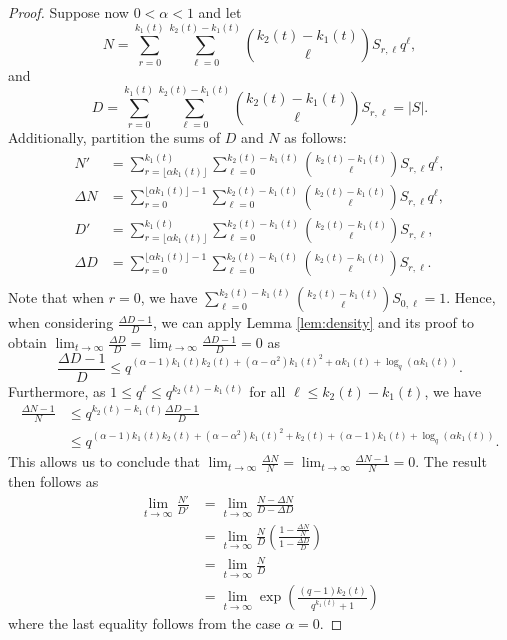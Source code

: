 \documentclass[10pt,a4paper]{amsart}
\begin{document}
\begin{proof}
Suppose now $0<\alpha <1$ and let $$N = \sum_{r=0}^{k_1(t)} \sum_{\ell=0}^{k_2(t)-k_1(t)} \binom{k_2(t)-k_1(t)}{\ell}S_{r,\ell}q^{\ell},$$ and $$D =\sum_{r=0}^{k_1(t)} \sum_{\ell=0}^{k_2(t)-k_1(t)} \binom{k_2(t)-k_1(t)}{\ell}S_{r,\ell} = |S|.$$ Additionally, partition the sums of $D$ and $N$ as follows:
\begin{align*}
    N' &= \sum_{r=\lfloor\alpha k_1(t)\rfloor}^{k_1(t)} \sum_{\ell=0}^{k_2(t)-k_1(t)} \binom{k_2(t)-k_1(t)}{\ell}S_{r,\ell}q^{\ell},\\
    \Delta N &= \sum_{r=0}^{\lfloor \alpha k_1(t) \rfloor -1} \sum_{\ell=0}^{k_2(t)-k_1(t)} \binom{k_2(t)-k_1(t)}{\ell}S_{r,\ell}q^{\ell}, \\
    D' &= \sum_{r=\lfloor \alpha k_1(t) \rfloor}^{k_1(t)} \sum_{\ell=0}^{k_2(t)-k_1(t)} \binom{k_2(t)-k_1(t)}{\ell}S_{r,\ell},\\
    \Delta D &= \sum_{r=0}^{\lfloor \alpha k_1(t) \rfloor -1} \sum_{\ell=0}^{k_2(t)-k_1(t)} \binom{k_2(t)-k_1(t)}{\ell}S_{r,\ell}. \\
\end{align*}
Note that when $r=0$, we have $\sum_{\ell=0}^{k_2(t)-k_1(t)} \binom{k_2(t)-k_1(t)}{\ell}S_{0,\ell} =1$. Hence, when considering  $\frac{\Delta D -1}{D}$, we can apply Lemma \ref{lem:density} and its proof to obtain  $\lim_{t \rightarrow \infty} \frac{\Delta D}{D} = \lim_{t \rightarrow \infty} \frac{\Delta D - 1}{D} =  0$ as 
\[
    \frac{\Delta D -1}{D} \leq q^{(\alpha-1) k_1(t) k_2(t) + (\alpha-\alpha^2) k_1(t)^2 + \alpha k_1(t) + \log_q(\alpha k_1(t))}.
\]
Furthermore, as $1\leq q^\ell \leq q^{k_2(t)-k_1(t)}$ for all $\ell \leq k_2(t)-k_1(t)$, we have
\begin{align*}
    \frac{\Delta N - 1}{N} &\leq q^{k_2(t)-k_1(t)} \frac{\Delta D -1}{D} \\
    &\leq q^{(\alpha-1) k_1(t) k_2(t) + (\alpha-\alpha^2) k_1(t)^2 + k_2(t) + (\alpha -1)k_1(t) + \log_q(\alpha k_1(t))}.
\end{align*}
This allows us to conclude that $\lim_{t\rightarrow \infty} \frac{\Delta N}{N} = \lim_{t\rightarrow \infty} \frac{\Delta N -1 }{N} = 0$. The result then follows as
\begin{align*}
   \lim_{t\rightarrow \infty} \frac{N'}{D'} &= \lim_{t\rightarrow \infty}\frac{N-\Delta N}{D- \Delta D}\\
   &= \lim_{t\rightarrow \infty} \frac{N}{D} \left(\frac{1- \frac{\Delta N}{N}}{1- \frac{\Delta D}{D}} \right)  \\
   &= \lim_{t\rightarrow \infty} \frac{N}{D}\\ 
     &= \lim_{t\rightarrow \infty} \exp \left( \frac{(q-1)k_2(t)}{q^{k_1(t)}+1}\right)
  \end{align*}
where the last equality follows from the case $\alpha = 0$. 
\end{proof}
\end{document}
